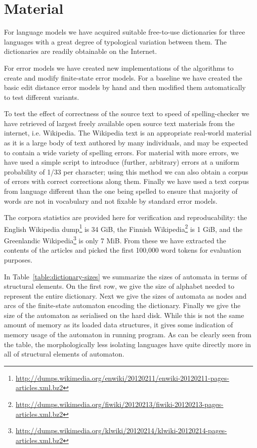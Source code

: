 \documentclass[11pt]{article}
\begin{document}
\section{Material}
\label{sec:materials}

For language models we have acquired suitable free-to-use
dictionaries for three languages with a great degree of
typological variation between them. The dictionaries
are readily obtainable on the Internet.

For error models we have created new implementations of the algorithms
to create and modify finite-state error models. For a baseline we have created
the basic edit distance error models by hand and then modified them
automatically to test different variants.

To test the effect of correctness of the source text to speed of
spelling-checker we have retrieved of largest freely available open source text
materials from the internet, i.e. Wikipedia. The Wikipedia text is
an appropriate real-world material as it is a large body of text
authored by many individuals, and may be expected to contain a wide variety of spelling
errors. For material with more errors, we have used a simple script to
introduce (further, arbitrary) errors at a uniform probability of 1/33 per character;
using this method we can also obtain a corpus of errors with correct
corrections along them. Finally we have used a text corpus from language
different than the one being spelled to ensure that majority of words are not
in vocabulary and not fixable by standard error models.

The corpora statistics are provided here for verification and reproducability:
the English Wikipedia
dump\footnote{\url{http://dumps.wikimedia.org/enwiki/20120211/enwiki-20120211-pages-articles.xml.bz2}}
is 34 GiB, the Finnish
Wikipedia\footnote{\url{http://dumps.wikimedia.org/fiwiki/20120213/fiwiki-20120213-pages-articles.xml.bz2}}
is 1 GiB, and the Greenlandic
Wikipedia\footnote{\url{http://dumps.wikimedia.org/klwiki/20120214/klwiki-20120214-pages-articles.xml.bz2}}
is only 7 MiB. From these we have extracted the contents of the articles and
picked the first 100,000 word tokens for evaluation purposes.

In Table~\ref{table:dictionary-sizes} we summarize the sizes of automata in
terms of structural elements. On the first row, we give the size of
alphabet needed to represent the entire dictionary. Next we give the sizes of automata as nodes and
arcs of the finite-state automaton encoding the dictionary. Finally we give the
size of the automaton as serialised on the hard disk. While this is not the
same amount of memory as its loaded data structures, it gives some indication
of memory usage of the automaton in running program. As can be clearly
seen from the table, the morphologically less isolating languages have quite
directly more in all of structural elements of automaton.
\end{document}
